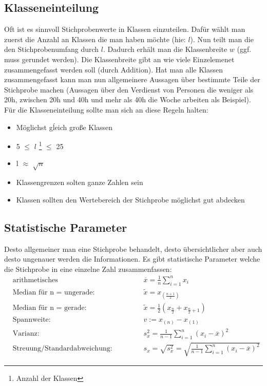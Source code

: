 \documentclass[a4paper]{scrartcl}
\begin{document}
        \subsection{Klasseneinteilung}
            Oft ist es sinnvoll Stichprobenwerte in Klassen einzuteilen. Dafür wählt man zuerst die Anzahl an Klassen die man haben möchte (hie: \(l\)). Nun teilt man die
            den Stichprobenumfang durch \(l\). Dadurch erhält man die Klassenbreite \(w\) (ggf. muss gerundet werden). Die Klassenbreite gibt an wie viele Einzelemenet zusammengefasst werden
            soll (durch Addition). Hat man alle Klassen zusammengefasst kann man nun allgemeinere Aussagen über bestimmte Teile der Stichprobe machen (Aussagen über den Verdienst von 
            Personen die weniger als 20h, zwischen 20h und 40h und mehr als 40h die Woche arbeiten als Beispiel). \\
            Für die Klasseneinteilung sollte man sich an diese Regeln halten: 
            \begin{itemize}
                \item Möglichst gĺeich große Klassen
                \item 5 \(\le\) \(l\) \footnote{Anzahl der Klassen} \(\le\) 25
                \item l \(\approx\) \(\sqrt{n}\)
                \item Klassengrenzen solten ganze Zahlen sein 
                \item Klassen sollten den Wertebereich der Stichprobe möglichst gut abdecken
            \end{itemize}  
        \subsection{Statistische Parameter}
            Desto allgemeiner man eine Stichprobe behandelt, desto übersichtlicher  aber auch desto ungenauer werden die Informationen.
            Es gibt statistische Parameter welche die Stichprobe in eine einzelne Zahl zusammenfassen: 
            \begin{equation*}
                \begin{aligned}
                    & \text{arithmetisches Mittel/Stichprobenmitte: } & \overline{x} = \frac{1}{n} \sum_{i=1}^n x_i \\
                    & \text{Median für n = ungerade:} & \tilde{x} =  x_{(\frac{n+1}{2})}  \\
                    & \text{Median für n = gerade: } & \tilde{x} = \frac{1}{2} (x_{\frac{n}{2}} + x_{\frac{n}{2} + 1}) \\
                    & \text{Spannweite: } & v := x_{(n)} - x_{(1)} \\
                    & \text{Varianz: } & s_x^2 = \frac{1}{n - 1} \sum_{i=1}^n(x_i - \overline{x})^2 \\
                    & \text{Streuung/Standardabweichung: } & s_x = \sqrt{s_x^2} = \sqrt{\frac{1}{n - 1} \sum_{i=1}^n(x_i - \overline{x})^2 }  
                \end{aligned}
            \end{equation*}
\end{document}
